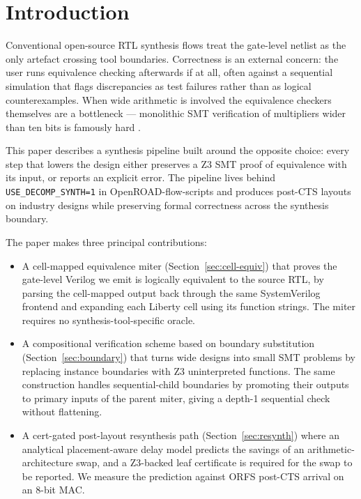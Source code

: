 \documentclass[11pt,a4paper]{article}
\begin{document}
\section{Introduction}

Conventional open-source RTL synthesis flows
\cite{wolf2013yosys,brayton2010abc,ajayi2019openroad} treat the
gate-level netlist as the only artefact crossing tool boundaries.
Correctness is an external concern: the user runs equivalence
checking afterwards if at all, often against a sequential simulation
that flags discrepancies as test failures rather than as logical
counterexamples.  When wide arithmetic is involved the equivalence
checkers themselves are a bottleneck --- monolithic SMT
verification of multipliers wider than ten bits is famously hard
\cite{kaivola2009replacing}.

This paper describes a synthesis pipeline built around the opposite
choice: every step that lowers the design either preserves a Z3 SMT
proof of equivalence with its input, or reports an explicit error.
The pipeline lives behind \texttt{USE\_DECOMP\_SYNTH=1} in
OpenROAD-flow-scripts and produces post-CTS layouts on industry
designs while preserving formal correctness across the synthesis
boundary.

The paper makes three principal contributions:

\begin{itemize}
\item A cell-mapped equivalence miter (Section~\ref{sec:cell-equiv})
that proves the gate-level Verilog we emit is logically
equivalent to the source RTL, by parsing the cell-mapped output
back through the same SystemVerilog frontend and expanding each
Liberty cell using its function strings.  The miter requires no
synthesis-tool-specific oracle.
\item A compositional verification scheme based on boundary
substitution (Section~\ref{sec:boundary}) that turns wide
designs into small SMT problems by replacing instance boundaries
with Z3 uninterpreted functions.  The same construction handles
sequential-child boundaries by promoting their outputs to primary
inputs of the parent miter, giving a depth-1 sequential check
without flattening.
\item A cert-gated post-layout resynthesis path
(Section~\ref{sec:resynth}) where an analytical placement-aware
delay model predicts the savings of an arithmetic-architecture
swap, and a Z3-backed leaf certificate is required for the swap
to be reported.  We measure the prediction against ORFS post-CTS
arrival on an 8-bit MAC.
\end{itemize}
\end{document}
